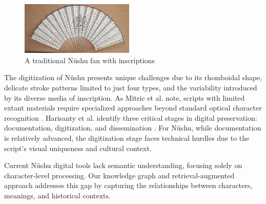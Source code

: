 \documentclass{article}
\begin{document}
    \begin{figure}[htb]
    \centering
    \includegraphics[width=0.48\textwidth]{images/nushu_fan.jpg}
    \caption{A traditional N\"{u}shu fan with inscriptions}
    \label{fig:nushu_fan}
    \end{figure}

    The digitization of N\"{u}shu presents unique challenges due to its rhomboidal shape, delicate stroke patterns limited to just four types, and the variability introduced by its diverse media of inscription. As Mitric et al. note, scripts with limited extant materials require specialized approaches beyond standard optical character recognition \cite{mitricAIComputerVision2024}. Harisanty et al. identify three critical stages in digital preservation: documentation, digitization, and dissemination \cite{harisantyculturalheritagepreservation2024}. For N\"{u}shu, while documentation is relatively advanced, the digitization stage faces technical hurdles due to the script's visual uniqueness and cultural context.
    
    Current N\"{u}shu digital tools lack semantic understanding, focusing solely on character-level processing. Our knowledge graph and retrieval-augmented approach addresses this gap by capturing the relationships between characters, meanings, and historical contexts.
\end{document}
